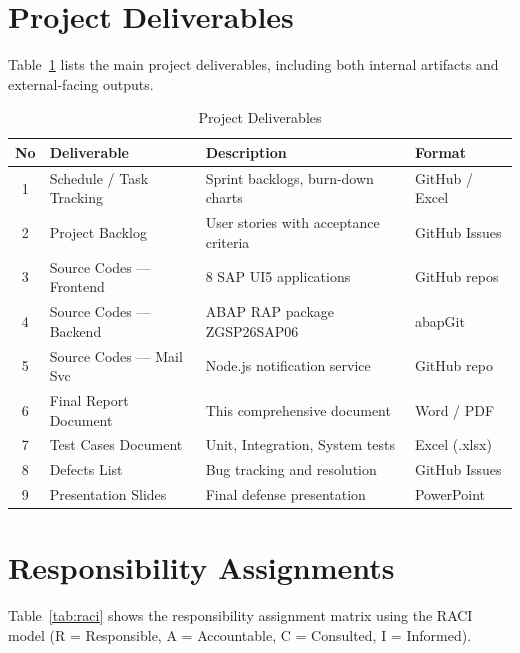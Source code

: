 \documentclass[12pt,a4paper]{report}
\begin{document}
\section{Project Deliverables}

Table~\ref{tab:deliverables} lists the main project deliverables, including both internal artifacts and external-facing outputs.

\begin{table}[H]
\centering\small
\begin{tabularx}{\textwidth}{|c|X|X|l|}
  \hline
  \rowcolor{tableheadpeach}
  \textbf{No} & \textbf{Deliverable} & \textbf{Description} & \textbf{Format} \\ \hline
  1 & Schedule / Task Tracking  & Sprint backlogs, burn-down charts    & GitHub / Excel \\ \hline
  2 & Project Backlog           & User stories with acceptance criteria & GitHub Issues \\ \hline
  3 & Source Codes --- Frontend  & 8 SAP UI5 applications               & GitHub repos \\ \hline
  4 & Source Codes --- Backend   & ABAP RAP package ZGSP26SAP06         & abapGit \\ \hline
  5 & Source Codes --- Mail Svc  & Node.js notification service          & GitHub repo \\ \hline
  6 & Final Report Document     & This comprehensive document           & Word / PDF \\ \hline
  7 & Test Cases Document       & Unit, Integration, System tests       & Excel (.xlsx) \\ \hline
  8 & Defects List              & Bug tracking and resolution           & GitHub Issues \\ \hline
  9 & Presentation Slides       & Final defense presentation            & PowerPoint \\ \hline
\end{tabularx}
\caption{Project Deliverables}
\label{tab:deliverables}
\end{table}


\section{Responsibility Assignments}

Table~\ref{tab:raci} shows the responsibility assignment matrix using the RACI model (R = Responsible, A = Accountable, C = Consulted, I = Informed).
\end{document}
